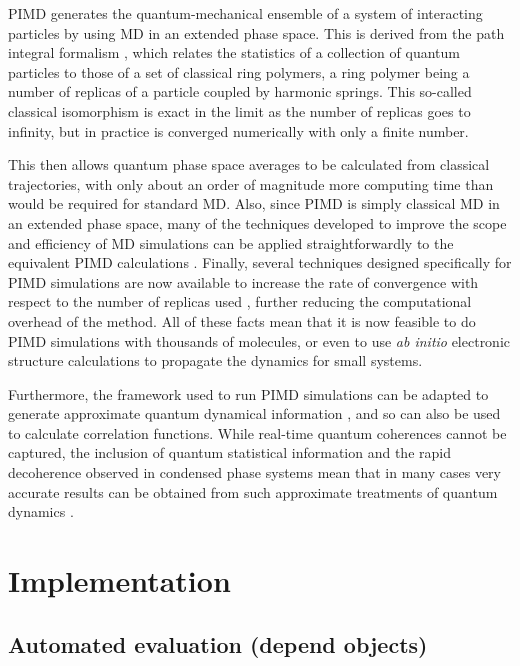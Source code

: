 \documentclass[11pt,english,fleqn]{report}
\begin{document}
PIMD generates the quantum-mechanical ensemble of a system of interacting
particles by using MD in an extended phase space. This is derived
from the path integral formalism \cite{feyn-hibb65book}, which
relates the statistics of a collection of quantum particles to those
of a set of classical ring polymers, a ring polymer being a number
of replicas of a particle coupled by harmonic springs. This so-called
classical isomorphism is exact in the limit as the number of replicas
goes to infinity, but in practice is converged numerically with only
a finite number.

This then allows quantum phase space averages to be calculated from
classical trajectories, with only about an order of magnitude more
computing time than would be required for standard MD. Also, since
PIMD is simply classical MD in an extended phase space, many of the
techniques developed to improve the scope and efficiency of MD simulations
can be applied straightforwardly to the equivalent PIMD calculations
\cite{ceri+10jcp,mart+99jcp}. Finally, several techniques designed
specifically for PIMD simulations are now available to increase the
rate of convergence with respect to the number of replicas used 
\cite{mark-mano08jcp,ceri+11jcp,suzu95pla,chin97pla,ceri+12prsa,pere-tuck11jcp},
further reducing the computational overhead of the method. All
of these facts mean that it is now feasible to do PIMD simulations
with thousands of molecules, or even to use \emph{ab initio} electronic
structure calculations to propagate the dynamics for small systems.

Furthermore, the framework used to run PIMD simulations can be adapted
to generate approximate quantum dynamical information 
\cite{cao-voth93jcp,cao-voth94jcp,crai-mano04jcp,braa-mano06jcp},
and so can also be used to calculate correlation functions. While
real-time quantum coherences cannot be captured, the inclusion 
of quantum statistical information
and the rapid decoherence observed in condensed phase systems mean
that in many cases very accurate results can be obtained from such
approximate treatments of quantum dynamics \cite{habe+13arpc}.


\section{Implementation}


\subsection{Automated evaluation (depend objects)}
\end{document}
